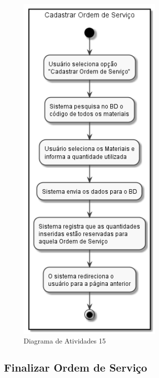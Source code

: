 \documentclass[rascunho,xindy,acronym,symbols]{fei}
\begin{document}
\begin{figure}[H]
    \centering
    \includegraphics[scale=0.6, width=200pt]{./Images/Cadastrar_Ordem_de_Servico.png}
    \caption{Diagrama de Atividades 15}
    \label{fig:diag_atv15}
\end{figure}

\subsection{Finalizar Ordem de Serviço}
\end{document}
